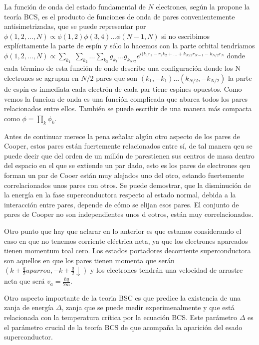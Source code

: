 La función de onda del estado fundamental de $N$ electrones, según la propone la teoría BCS, es el producto de funciones de onda de pares convenientemente antisimetrizadas, que se puede representar por $\phi(1,2,...,N) \propto \phi(1,2)\phi(3,4)...\phi(N-1,N)$ si no escribimos explícitamente la parte de espín y sólo lo hacemos con la parte orbital tendríamos $\phi(1,2,...,N) \propto \sum_{k_1}$ $\sum_{k_2} ... \sum_{k_3} g_{k_1} ... g_{k_{N/2}} e^{i (k_1 r_1 - r_2 k_2 + ... + k_{N/2} r_{N-1} - k_{N/2} r_N}$ donde cada término de esta función de onde describe una configuración donde los N electrones se agrupan en $N/2$ pares que son $(k_1, -k_1) ... (k_{N/2}, -k_{N/2})$ la parte de espín es inmediata cada electrón de cada par tiene espines opuestos. Como vemos la funcion de onda es una función complicada que abarca todos los pares relacionados entre ellos. También se puede escribir de una manera más compacta como $\phi = \prod\limits_k \phi_k$.

Antes de continuar merece la pena señalar algún otro aspecto de los pares de Cooper, estos pares están fuertemente relacionados entre sí, de tal manera qeu se puede decir que del orden de un millón de parestienen sus centros de masa dentro del espacio en el que se extiende un par dado, esto es los pares de electrones qeu forman un par de Cooer están muy alejados uno del otro, estando fuertemente correlacionados unos pares con otros. Se puede demostrar, que la disminución de la energía en la fase superconductora respecto al estado normal, debida a la interacción entre pares, depende de cómo se elijan esos pares. El conjunto de pares de Cooper no son independientes unos d eotros, están muy correlacionados.

Otro punto que hay que aclarar en lo anterior es que estamos considerando el caso en que no tenemos corriente eléctrica neta, ya que los electrones apareados tienen momentum toal cero. Los estados portadores  decorriente superconductora son aquellos en que los pares tienen momenta que serán $(k + \frac{q}{2} uparroa, -k + \frac{q}{2} \downarrow)$ y los electrones tendrán una velocidad de arrastre neta que será $v_a = \frac{\hbar q}{2m}$.

Otro aspecto importante de la teoria BSC es que predice la existencia de una zanja de energía $\Delta$, zanja que se puede medir experimenalmente y que está relacionada con la temperatura crítica por la ecuación BCS. Este parámetro $\Delta$ es el parámetro crucial de la teoría BCS de que acompaña la aparición del esado superconductor.

